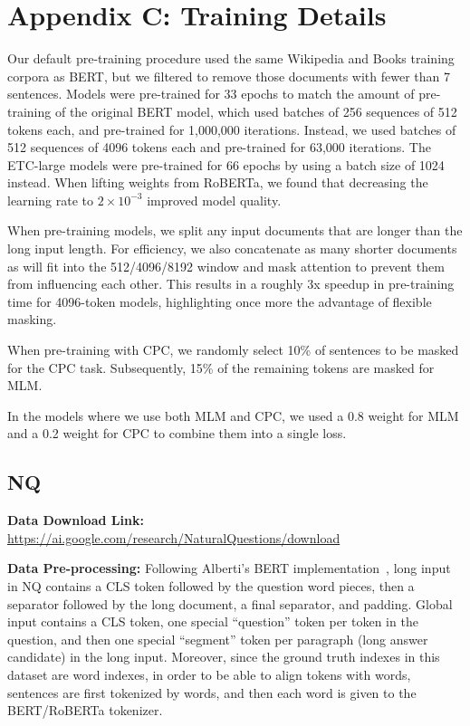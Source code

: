 \documentclass[11pt,a4paper]{article}
\begin{document}
\section*{Appendix C: Training Details}\label{app:training}

Our default pre-training procedure used the same Wikipedia and Books training corpora as BERT, but we filtered to remove those documents with fewer than 7 sentences. Models were pre-trained for 33 epochs to match the amount of pre-training of the original BERT model, which used batches of 256 sequences of 512 tokens each, and pre-trained for 1,000,000 iterations. Instead, we used batches of 512 sequences of 4096 tokens each and pre-trained for 63,000 iterations.  The ETC-large models were pre-trained for 66 epochs by using a batch size of 1024 instead. When lifting weights from RoBERTa, we found that decreasing the learning rate to $2 \times 10^{-3}$ improved model quality.


When pre-training models, we split any input documents that are longer than the long input length. For efficiency, we also concatenate as many shorter documents as will fit into the 512/4096/8192 window and mask attention to prevent them from influencing each other. This results in a roughly 3x speedup in pre-training time for 4096-token models, highlighting once more the advantage of flexible masking.

When pre-training with CPC, we randomly select 10\% of sentences to be masked for the CPC task. Subsequently, 15\% of the remaining tokens are masked for MLM.

In the models where we use both MLM and CPC, we used a 0.8 weight for MLM and a 0.2 weight for CPC to combine them into a single loss.

\subsection*{NQ}

{\bf Data Download Link:} \url{https://ai.google.com/research/NaturalQuestions/download}

{\bf Data Pre-processing:} Following Alberti's BERT implementation~\cite{alberti2019bert}, long input in NQ contains a CLS token followed by the question word pieces, then a separator followed by the long document, a final separator, and padding. Global input contains a CLS token, one special ``question'' token per token in the question, and then one special ``segment'' token per paragraph (long answer candidate) in the long input. Moreover, since the ground truth indexes in this dataset are word indexes, in order to be able to align tokens with words, sentences are first tokenized by words, and then each word is given to the BERT/RoBERTa tokenizer. 
\end{document}
